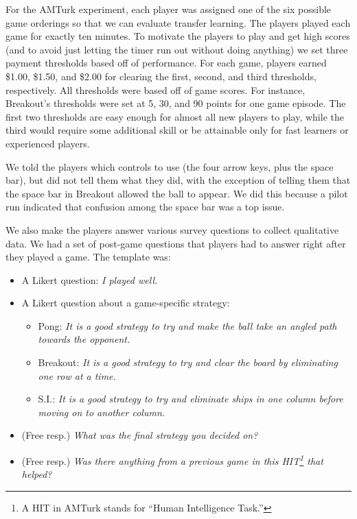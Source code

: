 \documentclass[letterpaper, 10 pt, conference]{ieeeconf}  %
\begin{document}
For the AMTurk experiment, each player was assigned one of the six possible game orderings so that
we can evaluate transfer learning. The players played each game for exactly ten minutes. To motivate
the players to play and get high scores (and to avoid just letting the timer run out without doing
anything) we set three payment thresholds based off of performance. For each game, players earned
\$1.00, \$1.50, and \$2.00 for clearing the first, second, and third thresholds, respectively. All
thresholds were based off of game scores. For instance, Breakout's thresholds were set at 5, 30, and
90 points for one game episode. The first two thresholds are easy enough for almost all new players
to play, while the third would require some additional skill or be attainable only for fast
learners or experienced players.

We told the players which controls to use (the four arrow keys, plus the space bar), but did not
tell them what they did, with the exception of telling them that the space bar in Breakout allowed
the ball to appear. We did this because a pilot run indicated that confusion among the space bar was
a top issue.

We also make the players answer various survey questions to collect qualitative data. We had a set
of post-game questions that players had to answer right after they played a game. The template was:

\begin{itemize}
    \item A Likert question: \emph{I played well.}
    \item A Likert question about a game-specific strategy:
    \begin{itemize}
        \item Pong: \emph{It is a good strategy to try and make the ball take an angled path towards the opponent.}
        \item Breakout: \emph{It is a good strategy to try and clear the board by eliminating one row at a time.}
        \item S.I.: \emph{It is a good strategy to try and eliminate ships in one column before moving on to another column.}
    \end{itemize}
    \item (Free resp.) \emph{What was the final strategy you decided on?}
    \item (Free resp.) \emph{Was there anything from a previous game in this HIT\footnote{A HIT in AMTurk stands
    for ``Human Intelligence Task.''} that helped?}
\end{itemize}
\end{document}
